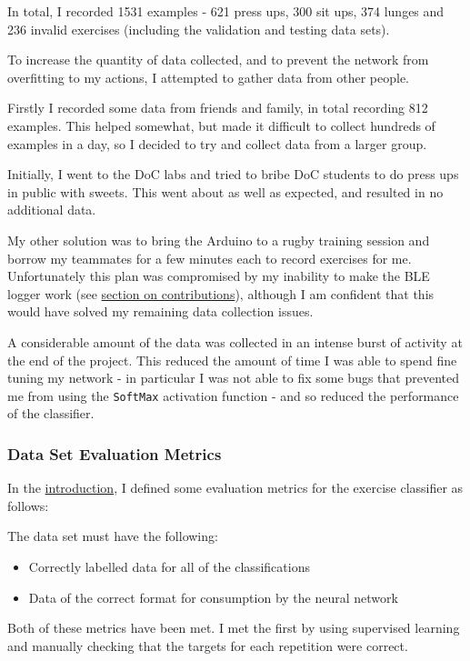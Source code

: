 \documentclass[a4paper]{article}
\begin{document}
In total, I recorded 1531 examples - 621 press ups, 300 sit ups, 374 lunges and 236 invalid exercises (including the validation and testing data sets).

To increase the quantity of data collected, and to prevent the network from overfitting to my actions, I attempted to gather data from other people. 

Firstly I recorded some data from friends and family, in total recording 812 examples. This helped somewhat, but made it difficult to collect hundreds of examples in a day, so I decided to try and collect data from a larger group.

Initially, I went to the DoC labs and tried to bribe DoC students to do press ups in public with sweets. This went about as well as expected, and resulted in no additional data. 

My other solution was to bring the Arduino to a rugby training session and borrow my teammates for a few minutes each to record exercises for me. Unfortunately this plan was compromised by my inability to make the BLE logger work (see \hyperref[para:ev_cl_loggerble]{section on contributions}), although I am confident that this would have solved my remaining data collection issues.

A considerable amount of the data was collected in an intense burst of activity at the end of the project. This reduced the amount of time I was able to spend fine tuning my network - in particular I was not able to fix some bugs that prevented me from using the \lstinline{SoftMax} activation function - and so reduced the performance of the classifier.

\subsubsection{Data Set Evaluation Metrics}

In the \hyperref[subsubsec:in_cs_dsmetrics]{introduction}, I defined some evaluation metrics for the exercise classifier as follows:

The data set must have the following:

\begin{itemize}
\item Correctly labelled data for all of the classifications
\item Data of the correct format for consumption by the neural network
\end{itemize}

Both of these metrics have been met. I met the first by using supervised learning and manually checking that the targets for each repetition were correct.
\end{document}
